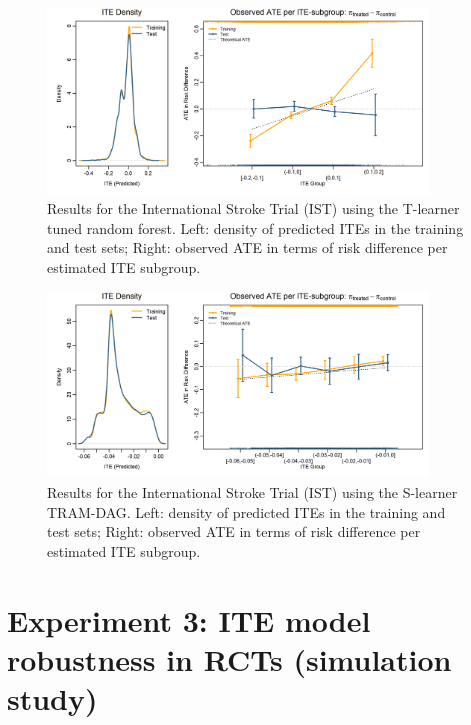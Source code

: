 \begin{figure}[htbp]
\centering
\includegraphics[width=0.9\textwidth]{img/results_IST/IST_tuned_rf_tlearner_density_ITE_ATE.png}
\caption{Results for the International Stroke Trial (IST) using the T-learner tuned random forest. Left: density of predicted ITEs in the training and test sets; Right: observed ATE in terms of risk difference per estimated ITE subgroup.}
\label{fig:IST_density_ITE_ATE_tuned_rf}
\end{figure}


\begin{figure}[htbp]
\centering
\includegraphics[width=0.9\textwidth]{img/results_IST/IST_TRAM_DAG_slearner_density_ITE_ATE.png}
\caption{Results for the International Stroke Trial (IST) using the S-learner TRAM-DAG. Left: density of predicted ITEs in the training and test sets; Right: observed ATE in terms of risk difference per estimated ITE subgroup.}
\label{fig:IST_density_ITE_ATE_TRAM_DAG}
\end{figure}



\clearpage

 

\section{Experiment 3: ITE model robustness in RCTs (simulation study)} \label{sec:results_experiment3}

